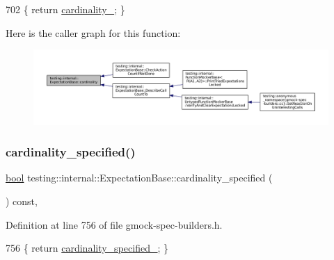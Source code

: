 \begin{DoxyCode}
702 \{ \textcolor{keywordflow}{return} \hyperlink{classtesting_1_1internal_1_1ExpectationBase_ad0aedcc01c0c9a998952a2b2f486595c}{cardinality\_}; \}
\end{DoxyCode}
Here is the caller graph for this function\+:
\nopagebreak
\begin{figure}[H]
\begin{center}
\leavevmode
\includegraphics[width=350pt]{classtesting_1_1internal_1_1ExpectationBase_a1399efffbc8675510a15c6ba1f18184b_icgraph}
\end{center}
\end{figure}
\mbox{\label{classtesting_1_1internal_1_1ExpectationBase_a8c3715b0c44d29eb53148036d9366940}} 
\subsubsection{\texorpdfstring{cardinality\+\_\+specified()}{cardinality\_specified()}}
{\footnotesize\ttfamily \hyperlink{classbool}{bool} testing\+::internal\+::\+Expectation\+Base\+::cardinality\+\_\+specified (\begin{DoxyParamCaption}{ }\end{DoxyParamCaption}) const\hspace{0.3cm}{\ttfamily [inline]}, {\ttfamily [protected]}}



Definition at line 756 of file gmock-\/spec-\/builders.\+h.


\begin{DoxyCode}
756 \{ \textcolor{keywordflow}{return} \hyperlink{classtesting_1_1internal_1_1ExpectationBase_ad2ca7220ed1a395bd850ff06c500a402}{cardinality\_specified\_}; \}
\end{DoxyCode}
\mbox{\label{classtesting_1_1internal_1_1ExpectationBase_aaeb143b6f8676e9a6fb9b17678344f03}} 
